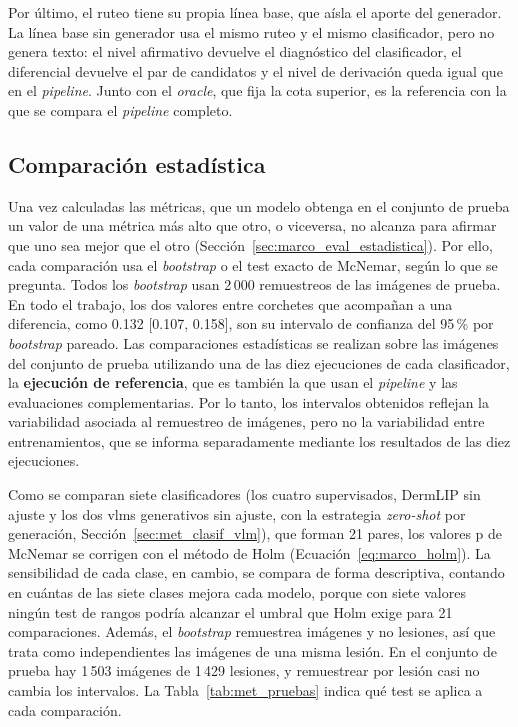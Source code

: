 Por último, el ruteo tiene su propia línea base, que aísla el aporte del generador. La línea base sin generador usa el
mismo ruteo y el mismo clasificador, pero no genera texto: el nivel afirmativo devuelve el diagnóstico del
clasificador, el diferencial devuelve el par de candidatos y el nivel de derivación queda igual que en el
\emph{pipeline}. Junto con el \emph{oracle}, que fija la cota superior, es la referencia con la que se compara el
\emph{pipeline} completo.

\subsection{Comparación estadística}
\label{sec:met_estadistica}

Una vez calculadas las métricas, que un modelo obtenga en el conjunto de prueba un valor de una métrica más alto que otro, o
viceversa, no alcanza para afirmar que uno sea mejor que el otro (Sección~\ref{sec:marco_eval_estadistica}). Por
ello, cada comparación usa el \emph{bootstrap} o el test exacto de McNemar, según lo que se pregunta. Todos los
\emph{bootstrap} usan 2\,000 remuestreos de las imágenes de prueba. En todo el trabajo, los dos valores entre corchetes que acompañan a una diferencia, como 0.132 [0.107, 0.158], son su intervalo de confianza del 95\,\% por \emph{bootstrap} pareado. Las comparaciones estadísticas se realizan sobre las imágenes del conjunto de prueba utilizando una de las diez ejecuciones de cada clasificador, la \textbf{ejecución de referencia}, que es también la que usan el \emph{pipeline} y las evaluaciones complementarias. Por lo tanto, los intervalos obtenidos reflejan la variabilidad asociada al remuestreo de imágenes, pero no la variabilidad entre entrenamientos, que se informa separadamente mediante los resultados de las diez ejecuciones.

Como se comparan siete clasificadores (los cuatro supervisados, DermLIP sin ajuste y los dos \glspl{vlm} generativos sin ajuste, con la estrategia \emph{zero-shot} por generación, Sección~\ref{sec:met_clasif_vlm}), que forman 21 pares, los valores p de McNemar se corrigen con el método
de Holm (Ecuación~\ref{eq:marco_holm}). La sensibilidad de cada clase, en cambio, se compara de forma descriptiva,
contando en cuántas de las siete clases mejora cada modelo, porque con siete valores ningún test de rangos podría
alcanzar el umbral que Holm exige para 21 comparaciones. Además, el \emph{bootstrap} remuestrea imágenes y no
lesiones, así que trata como independientes las imágenes de una misma lesión. En el conjunto de prueba hay 1\,503 imágenes de
1\,429 lesiones, y remuestrear por lesión casi no cambia los intervalos. La Tabla~\ref{tab:met_pruebas} indica qué test se aplica a cada comparación.

